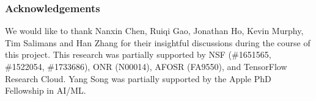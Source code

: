 \subsubsection*{Acknowledgements}
We would like to thank Nanxin Chen, Ruiqi Gao, Jonathan Ho, Kevin Murphy, Tim Salimans and Han Zhang for their insightful discussions during the course of this project. This research was partially supported by NSF (\#1651565, \#1522054, \#1733686),
ONR (N00014), AFOSR (FA9550), and TensorFlow Research Cloud. Yang Song was partially supported by the Apple PhD Fellowship in AI/ML.


